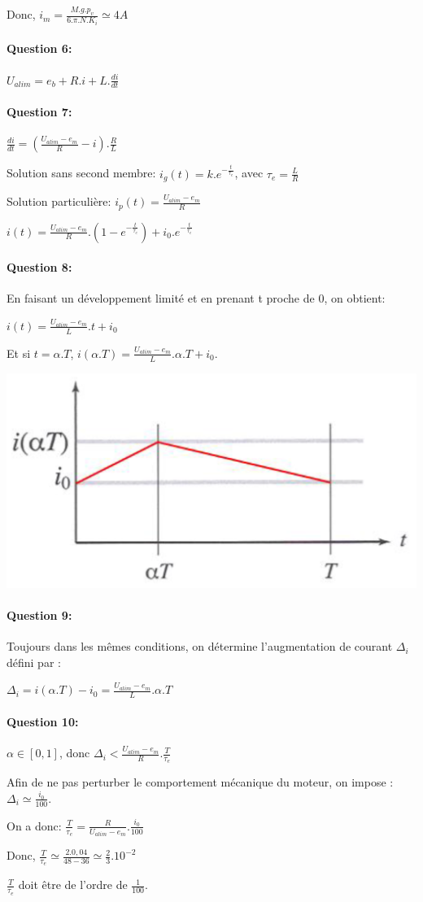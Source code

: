 Donc, $i_m=\frac{M.g.p_v}{6.\pi.N.K_i}\simeq 4A$

\paragraph{Question 6:}

$U_{alim}=e_b+R.i+L.\frac{di}{dt}$

\paragraph{Question 7:}

$\frac{di}{dt}=(\frac{U_{alim}-e_m}{R}-i).\frac{R}{L}$

Solution sans second membre: $i_g(t)=k.e^{-\frac{t}{\tau_e}}$, avec $\tau_e=\frac{L}{R}$

Solution particulière: $i_p(t)=\frac{U_{alim}-e_m}{R}$

$i(t)=\frac{U_{alim}-e_m}{R}.(1-e^{-\frac{t}{\tau_e}})+i_0.e^{-\frac{t}{\tau_e}}$

\paragraph{Question 8:}

En faisant un développement limité et en prenant t proche de 0, on obtient:

$i(t)=\frac{U_{alim}-e_m}{L}.t+i_0$

Et si $t=\alpha.T$, $i(\alpha.T)=\frac{U_{alim}-e_m}{L}.\alpha.T+i_0$.

\begin{center}
 \includegraphics[width=0.3\linewidth]{img/td02_17}
\end{center}

\paragraph{Question 9:}

Toujours dans les mêmes conditions, on détermine l'augmentation de courant $\Delta_i$ défini par :

$\Delta_i=i(\alpha.T)-i_0=\frac{U_{alim}-e_m}{L}.\alpha.T$

\paragraph{Question 10:}

$\alpha \in [0,1]$, donc $\Delta_i<\frac{U_{alim}-e_m}{R}.\frac{T}{\tau_e}$

Afin de ne pas perturber le comportement mécanique du moteur, on impose : $\Delta_i\simeq\frac{i_0}{100}$.

On a donc: $\frac{T}{\tau_e}=\frac{R}{U_{alim}-e_m}.\frac{i_0}{100}$

Donc, $\frac{T}{\tau_e}\simeq\frac{2.0,04}{48-36}\simeq\frac{2}{3}.10^{-2}$

$\frac{T}{\tau_e}$ doit être de l'ordre de $\frac{1}{100}$.


